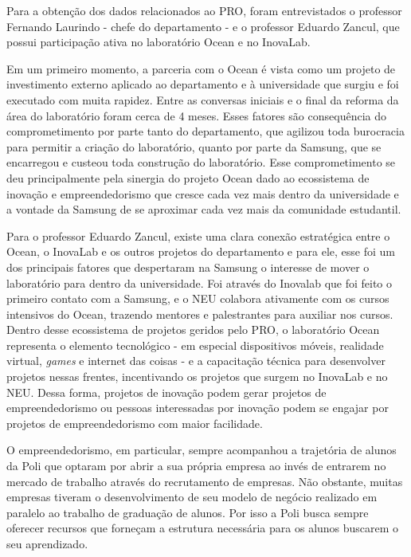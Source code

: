 Para a obtenção dos dados relacionados ao PRO, foram entrevistados o professor Fernando Laurindo - chefe do departamento - e o professor Eduardo Zancul, que possui participação ativa no laboratório Ocean e no InovaLab. 

Em um primeiro momento, a parceria com o Ocean é vista como um projeto de investimento externo aplicado ao departamento e à universidade que surgiu e foi executado com muita rapidez. Entre as conversas iniciais e o final da reforma da área do laboratório foram cerca de 4 meses. Esses fatores são consequência do comprometimento por parte tanto do departamento, que agilizou toda burocracia para permitir a criação do laboratório, quanto por parte da Samsung, que se encarregou e custeou toda construção do laboratório. Esse comprometimento se deu principalmente pela sinergia do projeto Ocean dado ao ecossistema de inovação e empreendedorismo que cresce cada vez mais dentro da universidade e a vontade da Samsung de se aproximar cada vez mais da comunidade estudantil.

Para o professor Eduardo Zancul, existe uma clara conexão estratégica entre o Ocean, o InovaLab e os outros projetos do departamento e para ele, esse foi um dos principais fatores que despertaram na Samsung o interesse de mover o laboratório para dentro da universidade. Foi através do Inovalab que foi feito o primeiro contato com a Samsung, e o NEU colabora ativamente com os cursos intensivos do Ocean, trazendo mentores e palestrantes para auxiliar nos cursos. Dentro desse ecossistema de projetos geridos pelo PRO, o laboratório Ocean representa o elemento tecnológico - em especial dispositivos móveis, realidade virtual, \textit{games} e internet das coisas - e a capacitação técnica para desenvolver projetos nessas frentes, incentivando os projetos que surgem no InovaLab e no NEU. Dessa forma, projetos de inovação podem gerar projetos de empreendedorismo ou pessoas interessadas por inovação podem se engajar por projetos de empreendedorismo com maior facilidade.

O empreendedorismo, em particular, sempre acompanhou a trajetória de alunos da Poli que optaram por abrir a sua própria empresa ao invés de entrarem no mercado de trabalho através do recrutamento de empresas. Não obstante, muitas empresas tiveram o desenvolvimento de seu modelo de negócio realizado em paralelo ao trabalho de graduação de alunos. Por isso a Poli busca sempre oferecer recursos que forneçam a estrutura necessária para os alunos buscarem o seu aprendizado.

